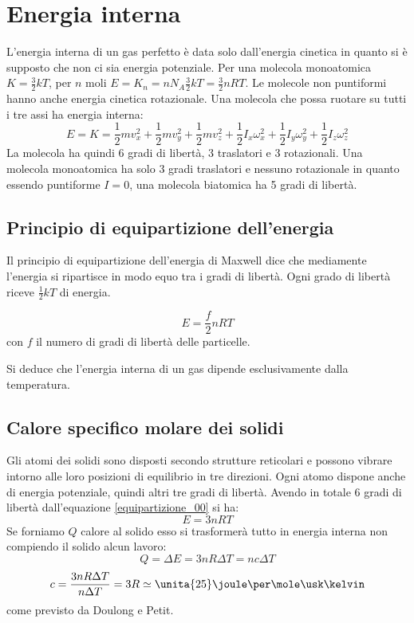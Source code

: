 \section{Energia interna}
L'energia interna di un gas perfetto è data solo dall'energia cinetica in quanto si è supposto che non ci sia energia potenziale. Per una molecola monoatomica $K=\frac{3}{2}kT$, per $n$ moli $E=K_n=nN_A\frac{3}{2}kT=\frac{3}{2}nRT$. Le molecole non puntiformi hanno anche energia cinetica rotazionale. Una molecola che possa ruotare su tutti i tre assi ha energia interna:
\begin{equation*}E=K=\frac{1}{2}mv_x^2+\frac{1}{2}mv_y^2+\frac{1}{2}mv_z^2+\frac{1}{2}I_x\omega_x^2+\frac{1}{2}I_y\omega_y^2+\frac{1}{2}I_z\omega_z^2\end{equation*}
La molecola ha quindi 6 gradi di libertà, 3 traslatori e 3 rotazionali. Una molecola monoatomica ha solo 3 gradi traslatori e nessuno rotazionale in quanto essendo puntiforme $I=0$, una molecola biatomica ha 5 gradi di libertà.
\subsection{Principio di equipartizione dell'energia}
Il principio di equipartizione dell'energia di Maxwell dice che mediamente l'energia si ripartisce in modo equo tra i gradi di libertà. Ogni grado di libertà riceve $\frac{1}{2}kT$ di energia.
\begin{Pri}
\begin{equation}
E=\frac{f}{2}nRT
\label{equipartizione_00}
\end{equation}
con $f$ il numero di gradi di libertà delle particelle.
\end{Pri}
Si deduce che l'energia interna di un gas dipende esclusivamente dalla temperatura.
\subsection{Calore specifico molare dei solidi}
Gli atomi dei solidi sono disposti secondo strutture reticolari e possono vibrare intorno alle loro posizioni di equilibrio in tre direzioni. Ogni atomo dispone anche di energia potenziale, quindi altri tre gradi di libertà. Avendo in totale 6 gradi di libertà dall'equazione \eqref{equipartizione_00} si ha:
\begin{equation*}E=3nRT\end{equation*}
Se forniamo $Q$ calore al solido esso si trasformerà tutto in energia interna non compiendo il solido alcun lavoro:
\begin{equation*}Q=\Delta E=3nR\Delta T=nc\Delta T\end{equation*}
\begin{equation*}c=\frac{3nR\Delta T}{n\Delta T}=3R\simeq \unita{25}\joule\per\mole\usk\kelvin\end{equation*}
come previsto da Doulong e Petit.
